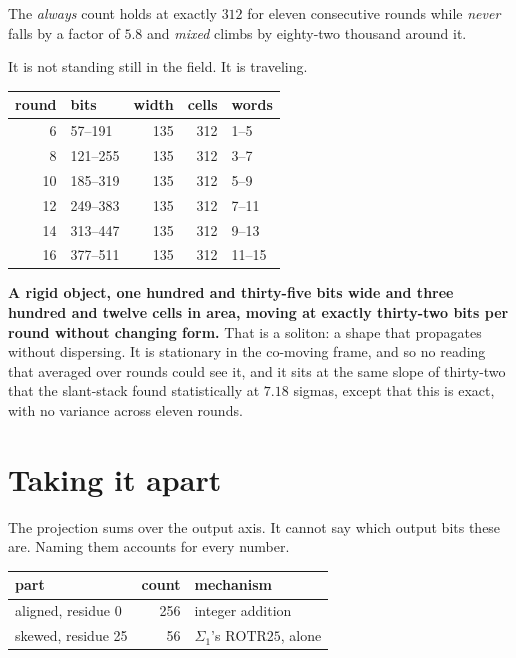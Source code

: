 The \emph{always} count holds at exactly \(312\) for eleven consecutive rounds while \emph{never}
falls by a factor of \(5.8\) and \emph{mixed} climbs by eighty-two thousand around it.

It is not standing still in the field. It is traveling.

\begin{center}
\begin{tabular}{rlrrl}
\toprule
round & bits & width & cells & words \\
\midrule
6 & 57--191 & 135 & 312 & 1--5 \\
8 & 121--255 & 135 & 312 & 3--7 \\
10 & 185--319 & 135 & 312 & 5--9 \\
12 & 249--383 & 135 & 312 & 7--11 \\
14 & 313--447 & 135 & 312 & 9--13 \\
16 & 377--511 & 135 & 312 & 11--15 \\
\bottomrule
\end{tabular}
\end{center}

\textbf{A rigid object, one hundred and thirty-five bits wide and three hundred and twelve cells in
area, moving at exactly thirty-two bits per round without changing form.} That is a soliton: a shape
that propagates without dispersing. It is stationary in the co-moving frame, and so no reading
that averaged over rounds could see it, and it sits at the same slope of thirty-two that the
slant-stack found statistically at \(7.18\) sigmas, except that this is exact, with no variance
across eleven rounds.

\section{Taking it apart}

The projection sums over the output axis. It cannot say which output bits these are. Naming them
accounts for every number.

\begin{center}
\begin{tabular}{lrl}
\toprule
part & count & mechanism \\
\midrule
aligned, residue 0 & 256 & integer addition \\
skewed, residue 25 & 56 & \(\Sigma_1\)'s \(\mathrm{ROTR}25\), alone \\
\bottomrule
\end{tabular}
\end{center}

